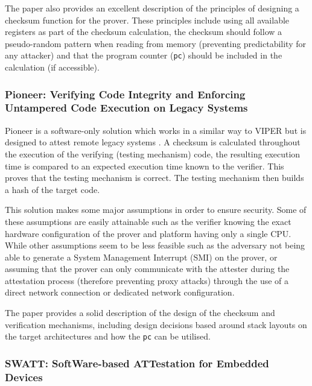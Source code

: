 The paper \cite{Li2011} also provides an excellent description of the principles of designing a checksum function for the prover. These principles include using all available registers as part of the checksum calculation, the checksum should follow a pseudo-random pattern when reading from memory (preventing predictability for any attacker) and that the program counter (\verb|pc|) should be included in the calculation (if accessible). 

\subsubsection*{Pioneer: Verifying Code Integrity and Enforcing Untampered Code Execution on Legacy Systems}

Pioneer is a software-only solution which works in a similar way to VIPER but is designed to attest remote legacy systems \cite{Seshadri2007}. A checksum is calculated throughout the execution of the verifying (testing mechanism) code, the resulting execution time is compared to an expected execution time known to the verifier. This proves that the testing mechanism is correct. The testing mechanism then builds a hash of the target code. 

This solution makes some major assumptions in order to ensure security. Some of these assumptions are easily attainable such as the verifier knowing the exact hardware configuration of the prover and platform having only a single CPU. While other assumptions seem to be less feasible such as the adversary not being able to generate a System Management Interrupt (SMI) on the prover, or assuming that the prover can only communicate with the attester during the attestation process (therefore preventing proxy attacks) through the use of a direct network connection or dedicated network configuration.

The paper provides a solid description of the design of the checksum and verification mechanisms, including design decisions based around stack layouts on the target architectures and how the \verb|pc| can be utilised.

\subsubsection*{SWATT: SoftWare-based ATTestation for Embedded Devices}

